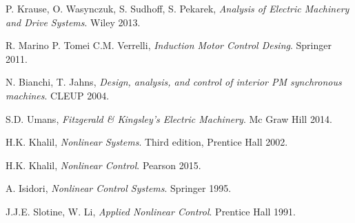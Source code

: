 \documentclass[11pt,a4paper,oneside]{book}
\numberwithin{equation}{section}
\theoremstyle{it}
\theoremstyle{definition}
\begin{document}
\begin{thebibliography}{99}

	P. Krause, O. Wasynczuk, S. Sudhoff, S. Pekarek, \emph{Analysis of Electric Machinery and Drive Systems}. Wiley 2013.

	R. Marino P. Tomei C.M. Verrelli, \emph{Induction Motor Control Desing}. Springer 2011.
			
	N. Bianchi, T. Jahns, \emph{Design, analysis, and control of interior PM synchronous machines}. CLEUP 2004.

	S.D. Umans, \emph{Fitzgerald \& Kingsley's Electric Machinery}. Mc Graw Hill 2014.
	
	H.K. Khalil, \emph{Nonlinear Systems}. Third edition, Prentice Hall 
	2002.
	
	H.K. Khalil, \emph{Nonlinear Control}. Pearson 2015.
	
	A. Isidori, \emph{Nonlinear Control Systems}. Springer 1995.
	
	J.J.E. Slotine, W. Li, \emph{Applied Nonlinear Control}. Prentice Hall 
	1991.

\end{thebibliography}
\end{document}
